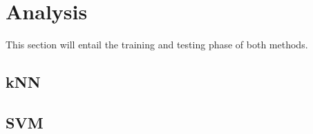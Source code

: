 \section{Analysis}
This section will entail the training and testing phase of both methods.

\subsection{kNN}
\subsection{SVM}